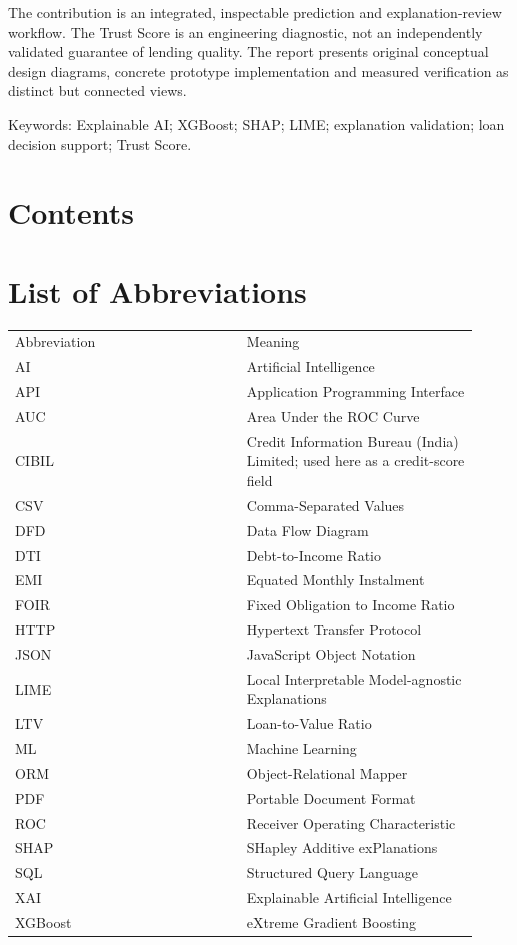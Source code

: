 \documentclass[12pt,a4paper]{report}
\begin{document}
The contribution is an integrated, inspectable prediction and explanation-review workflow. The Trust Score is an engineering diagnostic, not an independently validated guarantee of lending quality. The report presents original conceptual design diagrams, concrete prototype implementation and measured verification as distinct but connected views.

Keywords: Explainable AI; XGBoost; SHAP; LIME; explanation validation; loan decision support; Trust Score.

\chapter*{Contents}
\tableofcontents
\chapter*{List of Abbreviations}
\begin{longtable}{p{0.46\linewidth}p{0.46\linewidth}}

Abbreviation & Meaning\\
AI & Artificial Intelligence\\
API & Application Programming Interface\\
AUC & Area Under the ROC Curve\\
CIBIL & Credit Information Bureau (India) Limited; used here as a credit-score field\\
CSV & Comma-Separated Values\\
DFD & Data Flow Diagram\\
DTI & Debt-to-Income Ratio\\
EMI & Equated Monthly Instalment\\
FOIR & Fixed Obligation to Income Ratio\\
HTTP & Hypertext Transfer Protocol\\
JSON & JavaScript Object Notation\\
LIME & Local Interpretable Model-agnostic Explanations\\
LTV & Loan-to-Value Ratio\\
ML & Machine Learning\\
ORM & Object-Relational Mapper\\
PDF & Portable Document Format\\
ROC & Receiver Operating Characteristic\\
SHAP & SHapley Additive exPlanations\\
SQL & Structured Query Language\\
XAI & Explainable Artificial Intelligence\\
XGBoost & eXtreme Gradient Boosting\\
\end{longtable}
\end{document}
